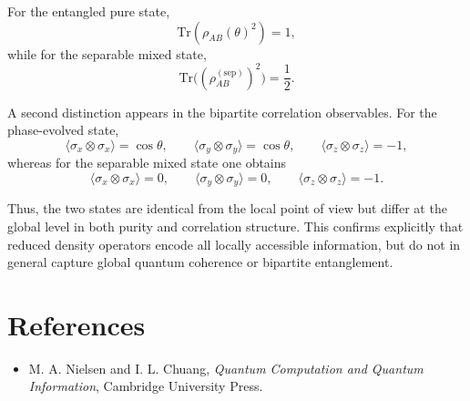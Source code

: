 \documentclass[a4paper]{article}
\begin{document}
For the entangled pure state,
\[
\mathrm{Tr}(\rho_{AB}(\theta)^2) = 1,
\]
while for the separable mixed state,
\[
\mathrm{Tr}\big((\rho_{AB}^{(\mathrm{sep})})^2\big) = \frac{1}{2}.
\]

A second distinction appears in the bipartite correlation observables. For the phase-evolved state,
\[
\langle \sigma_x \otimes \sigma_x \rangle = \cos\theta, \qquad
\langle \sigma_y \otimes \sigma_y \rangle = \cos\theta, \qquad
\langle \sigma_z \otimes \sigma_z \rangle = -1,
\]
whereas for the separable mixed state one obtains
\[
\langle \sigma_x \otimes \sigma_x \rangle = 0, \qquad
\langle \sigma_y \otimes \sigma_y \rangle = 0, \qquad
\langle \sigma_z \otimes \sigma_z \rangle = -1.
\]

Thus, the two states are identical from the local point of view but differ at the global level in both purity and correlation structure. This confirms explicitly that reduced density operators encode all locally accessible information, but do not in general capture global quantum coherence or bipartite entanglement.

\section{References}

\begin{itemize}
    \item M. A. Nielsen and I. L. Chuang, \textit{Quantum Computation and Quantum Information}, Cambridge University Press.
\end{itemize}
\end{document}

